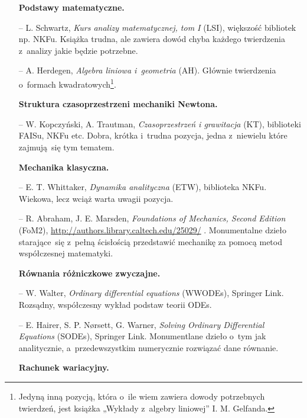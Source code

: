 \documentclass[a4paper,11pt]{article}
\begin{document}
\begin{itemize}
\item[] \textbf{Podstawy matematyczne.}

\item[--] L. Schwartz, \emph{Kurs analizy matematycznej, tom I} (LSI),
  większość bibliotek np. NKFu. Książka trudna, ale zawiera dowód
  chyba każdego twierdzenia z~analizy jakie będzie potrzebne.

\item[--] A. Herdegen, \emph{Algebra liniowa i~geometria} (AH).
  Głównie twierdzenia o~formach kwadratowych\footnote{Jedyną inną
    pozycją, która o~ile wiem zawiera dowody potrzebnych twierdzeń,
    jest książka „Wykłady z~algebry liniowej” I. M. Gelfanda.}.


\item[] \textbf{Struktura czasoprzestrzeni mechaniki Newtona.}

\item[--] W. Kopczyński, A. Trautman, \emph{Czasoprzestrzeń i
    grawitacja} (KT), biblioteki FAISu, NKFu etc. Dobra, krótka
  i~trudna pozycja, jedna z~niewielu które zajmują~się tym tematem.


\item[] \textbf{Mechanika klasyczna.}

\item[--] E. T. Whittaker, \emph{Dynamika analityczna} (ETW),
  biblioteka NKFu. Wiekowa, lecz wciąż warta uwagii pozycja.
\item[--] R. Abraham, J. E. Marsden, \emph{Foundations of Mechanics,
    Second Edition} (FoM2),
  \url{http://authors.library.caltech.edu/25029/} . Monumentalne
  dzieło starające~się z~pełną ścisłością przedstawić mechanikę za
  pomocą metod współczesnej matematyki.


\item[] \textbf{Równania różniczkowe zwyczajne.}

\item[--] W. Walter, \emph{Ordinary differential equations} (WWODEs),
  Springer Link. Rozsądny, współczesny wykład podstaw teorii ODEs.

\item[--] E. Hairer, S. P. N\o rsett, G. Warner, \emph{Solving Ordinary
    Differential Equations} (SODEs), Springer Link. Monumentlane
  dzieło o~tym jak analitycznie, a~przedewszystkim numerycznie
  rozwiązać dane równanie.


\item[] \textbf{Rachunek wariacyjny.}


\end{itemize}
\end{document}
